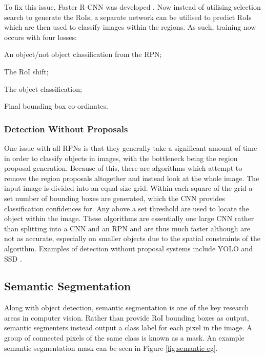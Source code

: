 To fix this issue, Faster R-CNN was developed \cite{ren_faster_2015}. Now instead of utilising selection search to generate the RoIs, a separate network can be utilised to predict RoIs which are then used to classify images within the regions. As such, training now occurs with four losses: 

\begin{enumerate*}
	\item An object/not object classification from the RPN;
	\item The RoI shift;
	\item The object classification;
	\item Final bounding box co-ordinates.
\end{enumerate*}

\subsubsection{Detection Without Proposals}\label{ch:Background,sec:objectDetection,sub:noProposals}

One issue with all RPNs is that they generally take a significant amount of time in order to classify objects in images, with the bottleneck being the region proposal generation. Because of this, there are algorithms which attempt to remove the region proposals altogether and instead look at the whole image. The input image is divided into an equal size grid. Within each square of the grid a set number of bounding boxes are generated, which the CNN provides classification confidences for. Any above a set threshold are used to locate the object within the image. These algorithms are essentially one large CNN rather than splitting into a CNN and an RPN and are thus much faster although are not as accurate, especially on smaller objects due to the spatial constraints of the algorithm. Examples of detection without proposal systems include YOLO \cite{redmon_you_2016} and SSD \cite{liu_ssd:_2016}. 

\subsection{Semantic Segmentation}\label{ch:Background,sec:semanticSegmentation}

Along with object detection, semantic segmentation is one of the key research areas in computer vision. Rather than provide RoI bounding boxes as output, semantic segmenters instead output a class label for each pixel in the image. A group of connected pixels of the same class is known as a mask. An example semantic segmentation mask can be seen in Figure \ref{fig:semantic-eg}.


